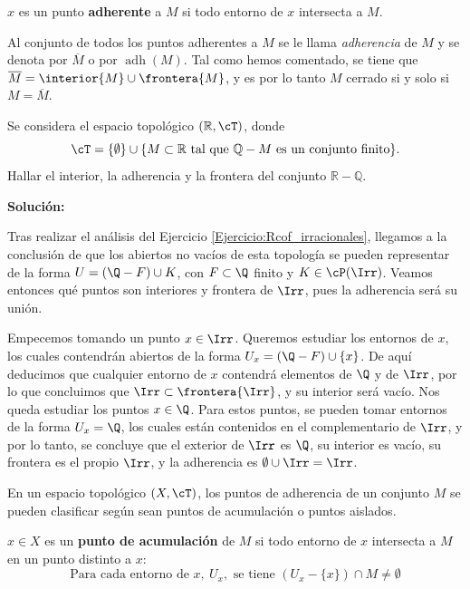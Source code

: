 \begin{deff}
    $x$ es un punto \textbf{adherente} a $M$ si todo entorno de $x$ intersecta a $M$.
\end{deff}
Al conjunto de todos los puntos adherentes a $M$ se le llama \textit{adherencia} de $M$ y se denota por $\overline{M}$ o por $\operatorname{adh}(M)$. Tal como hemos comentado, se tiene que $\overline{M} = \interior{M} \cup \frontera{M}$, y es por lo tanto $M$ cerrado si y solo si $M = \overline{M}$.

\begin{ex}
    Se considera el espacio topológico \((\mathbb{R}, \cT)\), donde
    \[
        \cT = \{\emptyset\} \cup \{M \subset \mathbb{R} \text{ tal que } \mathbb{Q} - M \text{ es un conjunto finito}\}.
    \]
    Hallar el interior, la adherencia y la frontera del conjunto \(\mathbb{R} - \mathbb{Q}\).

    \bigskip

    {\bf Solución:}

    Tras realizar el análisis del Ejercicio \ref{Ejercicio:Rcof_irracionales}, llegamos a la conclusión de que los abiertos no vacíos de esta topología se pueden representar de la forma $U = (\Q - F) \cup K$, con $F \subset \Q$ finito y $K \in \cP(\Irr)$. Veamos entonces qué puntos son interiores y frontera de $\Irr$, pues la adherencia será su unión.

    Empecemos tomando un punto $x\in\Irr$. Queremos estudiar los entornos de $x$, los cuales contendrán abiertos de la forma $U_x = (\Q - F) \cup \{x\}$. De aquí deducimos que cualquier entorno de $x$ contendrá elementos de $\Q$ y de $\Irr$, por lo que concluimos que $\Irr \subset \frontera{\Irr}$, y su interior será vacío. Nos queda estudiar los puntos $x\in\Q$. Para estos puntos, se pueden tomar entornos de la forma $U_x = \Q$, los cuales están contenidos en el complementario de $\Irr$, y por lo tanto, se concluye que el exterior de $\Irr$ es $\Q$, su interior es vacío, su frontera es el propio $\Irr$, y la adherencia es $\emptyset \cup \Irr = \Irr$.
\end{ex}

\bigskip

En un espacio topológico $(X,\cT)$, los puntos de adherencia de un conjunto $M$ se pueden clasificar según sean puntos de acumulación o puntos aislados.

\begin{deff}
    $x\in X$ es un {\bf punto de acumulación} de $M$ si todo entorno de $x$ intersecta a $M$ en un punto distinto a $x$:
    \[\text{Para cada entorno de } x, \ U_x, \text{ se tiene } (U_x -\{x\}) \cap M \neq \emptyset \]
\end{deff}


